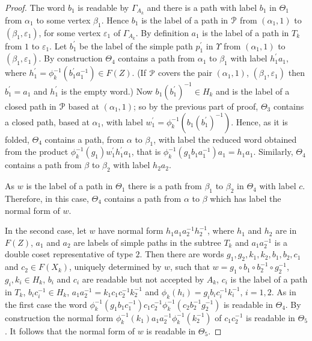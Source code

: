 \documentclass[a4paper,12pt]{article}
\renewcommand{\a}{\alpha }
\renewcommand{\b}{\beta }
\newcommand{\G}{\Gamma }
\newcommand{\e}{\varepsilon }
\newcommand{\T}{\Theta }
\newcommand{\U}{\Upsilon }
\newcommand{\cP}{{\cal{P}}}
\numberwithin{equation}{section}
\numberwithin{figure}{section}
\begin{document}
\begin{proof}
The word $b_1$ is readable by $\G_{A_k}$ and there
is a path with label $b_1$ in $\T_1$ from $\a_1$ to some vertex $\b_1$.
Hence $b_1$ is the label of a path in $\cP$ from $(\a_1,1)$ to
$(\b_1,\e_1)$, for some vertex $\e_1$ of $\G_{A_k}$.
By definition $a_1$ is the label of a path in $T_k$ from $1$ to $\e_1$.
Let $b_1^\prime$
 be the label of the simple path $p_1^\prime$ in $\U$ from
$(\a_1,1)$ to $(\b_1,\e_1)$. By construction $\T_4$ contains a path
from $\a_1$ to $\b_1$ with label $h_1^\prime a_1$, where
$h_1^\prime =\phi_k^{-1}(b_1^\prime a_1^{-1})\in F(Z)$.
(If $\cP$ covers the pair $(\a_1,1)$, $(\b_1,\e_1)$ then
$b_1^\prime=a_1$ and $h_1^\prime$ is the empty word.)
Now $b_1(b_1^\prime)^{-1}\in H_k$ and is the label of a closed
path  in $\cP$ based at $(\a_1,1)$; so by the
previous part of proof, $\T_3$ contains a closed path, based at $\a_1$,
 with label
$w_1^\prime=\phi_k^{-1}(b_1(b_1^\prime)^{-1})$. Hence, as it is folded,
$\T_4$ contains a path, from $\a$ to $\b_1$,
with label the reduced word obtained from the product
$\phi_k^{-1}(g_1)w_1^{\prime} h_1^\prime a_1$, that is
 $\phi_k^{-1}(g_1b_1a_1^{-1}) a_1=h_1a_1$.
 Similarly, $\T_4$ contains a path from
$\b$ to $\b_2$ with label $h_2a_2$.

As $w$ is the label of a path in $\T_1$ there is a path from $\b_1$ to
$\b_2$ in $\T_4$ with label $c$. Therefore, in this case, $\T_4$ contains
a path from $\a$ to $\b$ which has label the normal form of $w$.

In the second case,
let $w$ have normal form $h_1 a_1 a_2^{-1} h_2^{-1} $, where
$h_1$ and $h_2$ are in $F(Z)$,  $a_1$ and $a_2$ are labels
of simple paths in the subtree $T_k$ and $a_1a_2^{-1}$ is a double coset
representative of type $2$. Then there are words
$g_1, g_2, k_1, k_2, b_1, b_2, c_1$ and $c_2\in F(X_k)$, uniquely
determined by $w$,  such that
$w=g_1\circ b_1 \circ b_2^{-1}\circ g_2^{-1}$,
$g_i, k_i\in H_k$, $b_i$ and $c_i$ are
readable but not accepted by  $A_k$, $c_i$ is the label of
a path in $T_k$, $b_ic_i^{-1}\in H_k$, $a_1a_2^{-1}=k_1c_1c_2^{-1}k_2^{-1}$
 and
$\phi_k(h_i)=g_ib_ic_i^{-1}k_i^{-1}$, $i=1,2$.
As in the first case the word $\phi_k^{-1}(g_1b_1c_1^{-1})c_1 c_2^{-1}
\phi_k^{-1}(c_2b_2^{-1}g_2^{-1})$ is readable in $\T_4$. By construction the
normal form $\phi_k^{-1}(k_1)a_1a_2^{-1}\phi_k^{-1}(k_2^{-1})$ of $c_1 c_2^{-1}$ is readable in
$\T_5$. It follows that the normal form of $w$ is readable in $\T_5$.
\end{proof}
\end{document}
